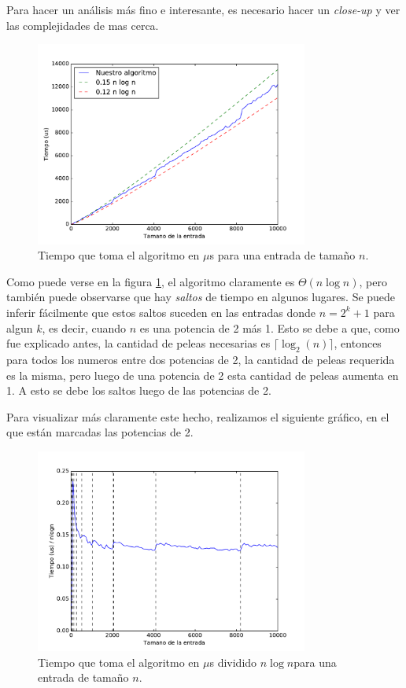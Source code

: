 Para hacer un análisis más fino e interesante, es necesario hacer un \emph{close-up} y ver las complejidades de mas cerca.

\begin{figure}[H]
 \centering
	\includegraphics[width=0.8\textwidth]{img/tiempos/kaioken1.pdf}
	\caption{\footnotesize Tiempo que toma el algoritmo en $\mu$s para una entrada de tamaño $n$.}
	\label{fig:kaioken-tiempos1}
\end{figure}

Como puede verse en la figura \ref{fig:kaioken-tiempos1}, el algoritmo claramente es $\Theta(n \log n)$, pero también puede observarse que hay \emph{saltos} de tiempo en algunos lugares. Se puede inferir fácilmente que estos saltos suceden en las entradas donde $n = 2^k + 1$ para algun $k$, es decir, cuando $n$ es una potencia de 2 más 1. Esto se debe a que, como fue explicado antes, la cantidad de peleas necesarias es $\lceil \log_2(n) \rceil$, entonces para todos los numeros entre dos potencias de 2, la cantidad de peleas requerida es la misma, pero luego de una potencia de 2 esta cantidad de peleas aumenta en 1. A esto se debe los saltos luego de las potencias de 2.

Para visualizar más claramente este hecho, realizamos el siguiente gráfico, en el que están marcadas las potencias de 2.

\begin{figure}[H]
 \centering
	\includegraphics[width=0.8\textwidth]{img/tiempos/kaioken2.pdf}
	\caption{\footnotesize Tiempo que toma el algoritmo en $\mu$s dividido $n\log n$para una entrada de tamaño $n$.}
	\label{fig:kaioken-tiempos2}
\end{figure}

